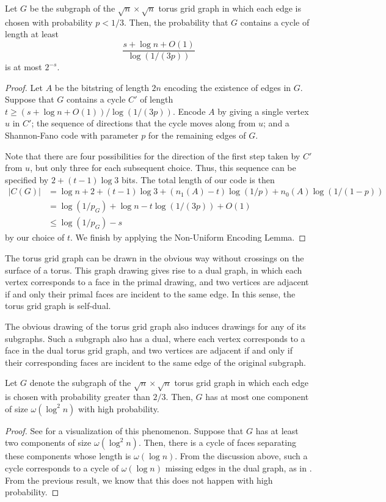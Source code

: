 \documentclass{patmorin}
\begin{document}
\begin{thm}
  Let $G$ be the subgraph of the $\sqrt{n} \times \sqrt{n}$ torus grid
  graph in which each edge is chosen with probability $p < 1/3$. Then,
  the probability that $G$ contains a cycle of length at least
  \[
    \frac{s + \log n + O(1)}{\log (1/(3p))}
  \]
  is at most $2^{-s}$.
\end{thm}
\begin{proof}
  Let $A$ be the bitstring of length $2n$ encoding the existence of
  edges in $G$. Suppose that $G$ contains a cycle $C'$ of length
  $t \geq (s + \log n + O(1))/\log (1/(3p))$. Encode $A$ by giving a
  single vertex $u$ in $C'$; the sequence of directions that the cycle
  moves along from $u$; and a Shannon-Fano code with parameter $p$ for
  the remaining edges of $G$.

  Note that there are four possibilities for the direction of the
  first step taken by $C'$ from $u$, but only three for each
  subsequent choice. Thus, this sequence can be specified by
  $2 + (t - 1) \log 3$ bits. The total length of our code is then
  \begin{align*}
    |C(G)| &= \log n + 2 + (t - 1) \log 3 + (n_1(A) - t) \log (1/p) +
             n_0(A) \log (1/(1 - p)) \\
           &= \log (1/p_G) + \log n - t \log (1/(3p)) + O(1) \\
           &\leq \log (1/p_G) - s
  \end{align*}
  by our choice of $t$. We finish by applying the Non-Uniform Encoding
  Lemma.
\end{proof}

The torus grid graph can be drawn in the obvious way without crossings
on the surface of a torus. This graph drawing gives rise to a dual
graph, in which each vertex corresponds to a face in the primal
drawing, and two vertices are adjacent if and only their primal faces
are incident to the same edge. In this sense, the torus grid graph is
self-dual.

The obvious drawing of the torus grid graph also induces drawings for
any of its subgraphs. Such a subgraph also has a dual, where each
vertex corresponds to a face in the dual torus grid graph, and two
vertices are adjacent if and only if their corresponding faces are
incident to the same edge of the original subgraph.

\begin{thm}
  Let $G$ denote the subgraph of the $\sqrt{n} \times \sqrt{n}$ torus
  grid graph in which each edge is chosen with probability greater
  than $2/3$. Then, $G$ has at most one component of size
  $\omega(\log^2 n)$ with high probability.
\end{thm}
\begin{proof}
  See  for a visualization of this phenomenon. Suppose
  that $G$ has at least two components of size $\omega(\log^2
  n)$. Then, there is a cycle of faces separating these components
  whose length is $\omega(\log n)$. From the discussion above, such a
  cycle corresponds to a cycle of $\omega(\log n)$ missing edges in
  the dual graph, as in . From the previous
  result, we know that this does not happen with high probability.
\end{proof}
\end{document}
